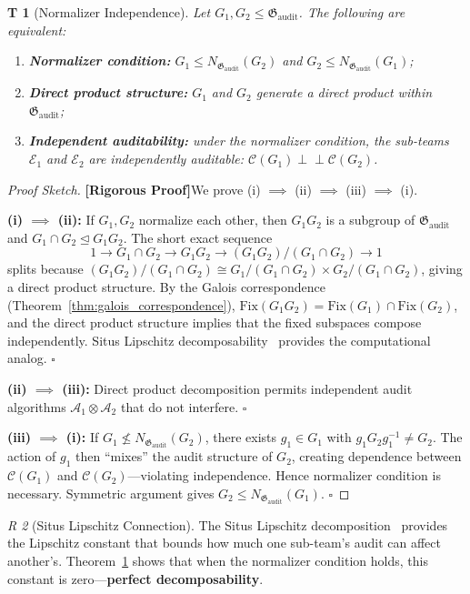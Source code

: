 \documentclass[12pt,a4paper]{article}
\newtheorem{theorem}Theorem[section]
\theoremstyle{remark}
\newtheorem{remark}[theorem]Remark
\newcommand{\indep}{\perp\!\!\!\perp}
\newcommand{\Fix}{\mathrm{Fix}}
\newcommand{\Normal}{\trianglelefteq}
\newcommand{\AuditGrp}{\mathfrak{G}_{\mathrm{audit}}}
\newcommand{\CEC}{\mathcal{C}}
\newcommand{\rigorous}{\textnormal{\textbf{[Rigorous Proof]}}}
\begin{document}
\begin{theorem}[Normalizer Independence]\label{thm:normalizer}
Let \(G_1, G_2 \leq \AuditGrp\). The following are equivalent:
\begin{enumerate}[label=(\roman*),itemsep=3pt]
    \item \textbf{Normalizer condition:} \(G_1 \leq N_{\AuditGrp}(G_2)\) and \(G_2 \leq N_{\AuditGrp}(G_1)\);
    \item \textbf{Direct product structure:} \(G_1\) and \(G_2\) generate a direct product within \(\AuditGrp\);
    \item \textbf{Independent auditability:} under the normalizer condition, the sub-teams \(\mathcal{E}_1\) and \(\mathcal{E}_2\) are independently auditable: \(\CEC(G_1) \indep \CEC(G_2)\).
\end{enumerate}
\end{theorem}
\begin{proof}[Proof Sketch]
\rigorous We prove (i) \(\implies\) (ii) \(\implies\) (iii) \(\implies\) (i).

\textbf{(i) \(\implies\) (ii):} If \(G_1, G_2\) normalize each other, then \(G_1 G_2\) is a subgroup of \(\AuditGrp\) and \(G_1 \cap G_2 \Normal G_1 G_2\). The short exact sequence
\[
    1 \to G_1 \cap G_2 \to G_1 G_2 \to (G_1 G_2)/(G_1 \cap G_2) \to 1
\]
splits because \((G_1 G_2)/(G_1 \cap G_2) \cong G_1/(G_1 \cap G_2) \times G_2/(G_1 \cap G_2)\), giving a direct product structure. By the Galois correspondence (Theorem~\ref{thm:galois_correspondence}), \(\Fix(G_1 G_2) = \Fix(G_1) \cap \Fix(G_2)\), and the direct product structure implies that the fixed subspaces compose independently. Situs Lipschitz decomposability~\cite{scx_lipschitz} provides the computational analog. \(\square\)

\textbf{(ii) \(\implies\) (iii):} Direct product decomposition permits independent audit algorithms \(\mathcal{A}_1 \otimes \mathcal{A}_2\) that do not interfere. \(\square\)

\textbf{(iii) \(\implies\) (i):} If \(G_1 \not\leq N_{\AuditGrp}(G_2)\), there exists \(g_1 \in G_1\) with \(g_1 G_2 g_1^{-1} \neq G_2\). The action of \(g_1\) then ``mixes'' the audit structure of \(G_2\), creating dependence between \(\CEC(G_1)\) and \(\CEC(G_2)\)---violating independence. Hence normalizer condition is necessary. Symmetric argument gives \(G_2 \leq N_{\AuditGrp}(G_1)\). \(\square\)
\end{proof}

\begin{remark}[Situs Lipschitz Connection]
The Situs Lipschitz decomposition~\cite{scx_lipschitz} provides the Lipschitz constant that bounds how much one sub-team's audit can affect another's. Theorem~\ref{thm:normalizer} shows that when the normalizer condition holds, this constant is zero---\textbf{perfect decomposability}.
\end{remark}
\end{document}
